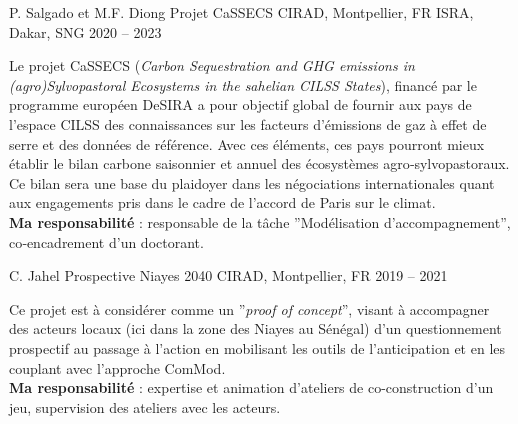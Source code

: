 

\begin{cventries}

  \cventry
    {P. Salgado et M.F. Diong} %
    {Projet CaSSECS} %
    {CIRAD, Montpellier, FR \hspace{5em} ISRA, Dakar, SNG} %
    {2020 -- 2023} %
    {
      \begin{cvitems} %
        Le projet CaSSECS (\emph{Carbon Sequestration and GHG emissions in (agro)Sylvopastoral Ecosystems in the sahelian CILSS States}), financé par le programme européen DeSIRA a pour objectif global de fournir aux pays de l’espace CILSS des connaissances sur les facteurs d’émissions de gaz à effet de serre et des données de référence. Avec ces éléments, ces pays pourront mieux établir le bilan carbone saisonnier et annuel des écosystèmes agro‑sylvopastoraux. Ce bilan sera une base du plaidoyer dans les négociations internationales quant aux engagements pris dans le cadre de l’accord de Paris sur le climat.\\
        \textbf{Ma responsabilité } : responsable de la tâche ”Modélisation d’accompagnement”, co‑encadrement d’un doctorant.
      \end{cvitems}
    }

  \cventry
  {C. Jahel} %
  {Prospective Niayes 2040} %
  {CIRAD, Montpellier, FR} %
  {2019 -- 2021} %
  {
    \begin{cvitems} %
      Ce projet est à considérer comme un ”\textit{proof of concept}”, visant à accompagner des acteurs locaux (ici dans la zone des Niayes au Sénégal) d’un questionnement prospectif au passage à l’action en mobilisant les outils de l’anticipation et en les couplant avec l’approche ComMod.\\
      \textbf{Ma responsabilité} : expertise et animation d'ateliers de co-construction d'un jeu, supervision des ateliers avec les acteurs.
    \end{cvitems}
  }


\end{cventries}
